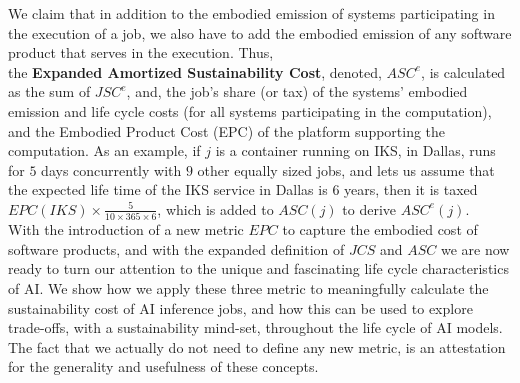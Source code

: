 We claim that in addition to the embodied emission of systems participating in the execution of 
a job, we also have to add the embodied emission of any software product that serves in the execution. Thus, \\ 
the {\bf Expanded Amortized Sustainability Cost}, denoted, $ASC^e$, is calculated as the sum of 
$JSC^e$, and, the job’s share (or tax) of the systems' embodied emission and life cycle costs (for all systems 
participating in the computation), and the Embodied Product Cost (EPC) of the platform supporting the computation.
As an example, if $j$ is a container running on IKS, in Dallas, runs for $5$ days concurrently 
with $9$ other equally sized jobs, and lets us assume that the expected life time of 
the IKS service in Dallas is $6$ years, then it is taxed $EPC(IKS) \times \frac{5}{10 \times 365 \times 6}$, which is added to $ASC(j)$ to derive $ASC^e(j)$. 
\\
With the introduction of a new metric $EPC$ to capture the embodied cost of software products, and 
with the expanded definition of $JCS$ and $ASC$ we are now ready to turn our attention to the 
unique and fascinating life cycle characteristics of AI. We show how we apply these three metric to meaningfully calculate the sustainability cost of AI inference jobs, and how this can be used to explore trade-offs, with a sustainability mind-set, throughout the life cycle of AI models. 
The fact that we actually do not need to define any new metric, is an attestation for the generality 
and usefulness of these concepts. 
\\
